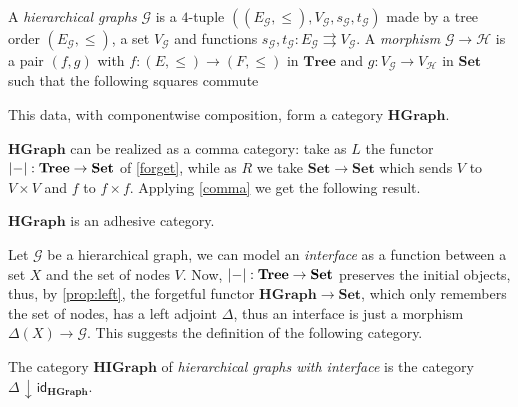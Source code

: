 \documentclass[runningheads,envcountsect]{lmcs}
\newcommand{\catname}[1]{\mathbf{#1}}
\newcommand{\id}[1]{\mathsf{id}_{#1}}
\newcommand{\comma}[2]{#1\hspace{1pt} {\downarrow}\hspace{1pt} #2}
\newcommand{\tree}{\catname{Tree}}
\theoremstyle{plain}
\theoremstyle{definition}
\begin{document}
\begin{defi} A \emph{hierarchical graphs} $\mathcal{G}$ is a  $4$-tuple $((E_\mathcal{G}, \leq), V_\mathcal{G}, s_\mathcal{G}, t_\mathcal{G})$ made by a tree order $(E_\mathcal{G}, \leq)$, a set $V_\mathcal{G}$ and functions $s_\mathcal{G},t_\mathcal{G}:E_\mathcal{G}\rightrightarrows V_\mathcal{G}$. A \emph{morphism} $\mathcal{G}\rightarrow \mathcal{H}$ is a pair $(f,g)$  with $f:(E, \leq)\rightarrow (F, \leq)$ in $\tree$ and  $g:V_\mathcal{G}\rightarrow V_\mathcal{H}$ in $\catname{Set}$ such that the following squares commute
	\begin{center}
	\end{center}
This data, with componentwise composition, form a category $\catname{HGraph}$.
\end{defi}
$\catname{HGraph}$ can be realized as a comma category: take as $L$ the functor $\abs{-}:\tree\rightarrow \catname{Set}$ of \cref{forget}, while as $R$ we take $\catname{Set}\to \catname{Set}$ which sends $V$ to $V\times V$ and $f$ to $f\times f$. Applying \cref{comma} we get the following result.
\begin{thm}\label{hiergraph}
	$\catname{HGraph}$ is an adhesive category.
\end{thm}
Let $\mathcal{G}$ be a hierarchical graph, we can model an \emph{interface} as a function between a set $X$ and the set of nodes $V$. Now,  $\abs{-}:\tree\rightarrow \catname{Set}$ preserves the initial objects, thus, by \cref{prop:left}, the forgetful functor $\catname{HGraph}\to \catname{Set}$, which only remembers the set of nodes, has a left adjoint $\Delta$, thus an interface is just a morphism $\Delta(X)\to \mathcal{G}$. This suggests the definition of the following category.
\begin{defi}
	The category $\catname{HIGraph}$ of \emph{hierarchical graphs with interface} is the category $\comma{\Delta}{\id{\catname{HGraph}}}$.
\end{defi}
\end{document}
